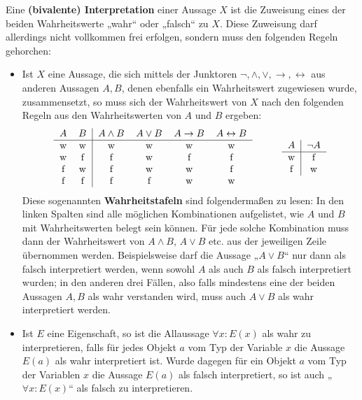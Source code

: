 \begin{de}[Interpretation] \label{def:interpretation}  
    Eine \textbf{(bivalente) Interpretation} einer Aussage $X$ ist die Zuweisung eines der beiden Wahrheitswerte „wahr“ oder „falsch“ zu $X$. Diese Zuweisung darf allerdings nicht vollkommen frei erfolgen, sondern muss den folgenden Regeln gehorchen:
    \begin{itemize}
        \item  Ist $X$ eine Aussage, die sich mittels der Junktoren $\neg,\land,\lor,\to,\leftrightarrow$ aus anderen Aussagen $A,B$, denen ebenfalls ein Wahrheitswert zugewiesen wurde, zusammensetzt, so muss sich der Wahrheitswert von $X$ nach den folgenden Regeln aus den Wahrheitswerten von $A$ und $B$ ergeben:
        \[\begin{tabular}{cc|cccc}
            $A$ & $B$  & $A\land B$ & $A\lor B$ & $A\to B$ & $A\leftrightarrow B$ \\
            \hline
            w&w& w & w & w & w \\
            w&f& f & w & f & f \\
            f&w& f & w & w & f \\
            f&f& f & f & w & w
        \end{tabular} \qquad\quad \begin{tabular}{c|c}
            $A$ & $\neg A$ \\
            \hline
            w& f \\
            f& w
        \end{tabular}\]
        Diese sogenannten \textbf{Wahrheitstafeln} sind folgendermaßen zu lesen: In den linken Spalten sind alle möglichen Kombinationen aufgelistet, wie $A$ und $B$ mit Wahrheitswerten belegt sein können. Für jede solche Kombination muss dann der Wahrheitswert von $A\land B$, $A\lor B$ etc. aus der jeweiligen Zeile übernommen werden. Beispielsweise darf die Aussage „$A\lor B$“ nur dann als falsch interpretiert werden, wenn sowohl $A$ als auch $B$ als falsch interpretiert wurden; in den anderen drei Fällen, also falls mindestens eine der beiden Aussagen $A,B$ als wahr verstanden wird, muss auch $A\lor B$ als wahr interpretiert werden.
        \item Ist $E$ eine Eigenschaft, so ist die Allaussage $\forall x: E(x)$ als wahr zu interpretieren, falls für jedes Objekt $a$ vom Typ der Variable $x$ die Aussage $E(a)$ als wahr interpretiert ist. Wurde dagegen für ein Objekt $a$ vom Typ der Variablen $x$ die Aussage $E(a)$ als falsch interpretiert, so ist auch „$\forall x: E(x)$“ als falsch zu interpretieren.

\end{itemize}
\end{de}
